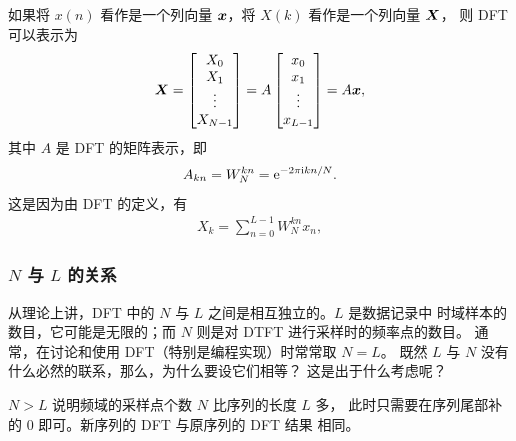 \begin{definition}
    如果将 $x(n)$ 看作是一个列向量 $\bm{x}$，将 $X(k)$ 看作是一个列向量 $\bm{X}$，
    则 DFT 可以表示为
    \begin{align*}
        \bm{X} = \begin{bmatrix}
            X_0 \\ X_1 \\ \vdots \\ X_{N - 1}
        \end{bmatrix}
        = A \begin{bmatrix}
            x_0 \\ x_1 \\ \vdots \\ x_{L - 1}
        \end{bmatrix} = A\bm{x},
    \end{align*}
    其中 $A$ 是 DFT 的矩阵表示，即
    \begin{align*}
        A_{kn} = W_N^{kn} = \mathrm{e}^{-2\pi\mathrm{i} kn/N}.
    \end{align*}
    这是因为由 DFT 的定义，有
    \begin{align*}
        X_k = \sum_{n = 0}^{L - 1}W_N^{kn}x_n,
    \end{align*}
\end{definition}

\subsubsection{$N$ 与 $L$ 的关系}

从理论上讲，DFT 中的 $N$ 与 $L$ 之间是相互独立的。$L$ 是数据记录中
时域样本的数目，它可能是无限的；而 $N$ 则是对 DTFT 进行采样时的频率点的数目。
通常，在讨论和使用 DFT（特别是编程实现）时常常取 $N = L$。
既然 $L$ 与 $N$ 没有什么必然的联系，那么，为什么要设它们相等？
这是出于什么考虑呢？

\begin{example}[$N > L$ 的情况]
    $N > L$ 说明频域的采样点个数 $N$ 比序列的长度 $L$ 多，
    此时只需要在序列尾部补的 $0$ 即可。新序列的 DFT 与原序列的 DFT 结果
    相同。
\end{example}

